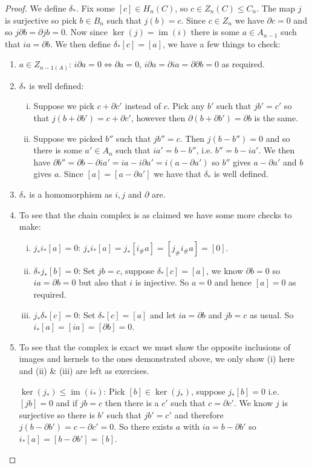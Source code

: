 \documentclass[12pt]{article}
\theoremstyle{definition}
\theoremstyle{definition}
\DeclareMathOperator{\im}{im}
\begin{document}
\begin{proof}
We define $\delta_*$.
Fix some $[c] \in H_n(C)$, so $c\in Z_n(C) \le C_n$.
The map $j$ is surjective so pick $b \in B_n$ such that $j(b) = c$.
Since $c\in Z_n$ we have $\partial c = 0$ and so $j\partial b = \partial j b  = 0$.
Now since $\ker(j) = \im(i)$ there is some $a \in A_{n-1}$ such that $ia = \partial b$.
We then define $\delta_*[c] = [a]$, we have a few things to check:
\begin{enumerate}
\item $a\in Z_{n-1(A)}$: $i\partial a = 0 \iff \partial a = 0$, $i \partial a = \partial ia = \partial \partial b = 0$ as required.
\item $\delta_*$ is well defined:
\begin{enumerate}[(i)]
\item Suppose we pick $c + \partial c'$ instead of $c$.
Pick any $b'$ such that $jb' = c'$ so that $j(b + \partial b') = c + \partial c'$, however then $\partial(b + \partial b') = \partial b$ is the same.
\item Suppose we picked $b''$ such that $jb'' = c$.
Then $j(b- b'') = 0$ and so there is some $a'\in A_n$ such that $ia' = b - b''$, i.e. $b'' = b - ia'$.
We then have $\partial b'' =\partial b  - \partial ia' = ia - i\partial a' = i(a - \partial a')$ so $b''$ gives $a-\partial a'$ and $b$ gives $a$.
Since $[a ] = [a-\partial a']$ we have that $\delta_*$ is well defined.
\end{enumerate}
\item $\delta_*$ is a homomorphism as $i,j$ and $\partial$ are.
\item To see that the chain complex is as claimed we have some more checks to make:
\begin{enumerate}[(i)]
\item $j_*i_*[a] = 0$: $j_*i_*[a]  = j_*[i_\# a] = [j_\# i_\# a ] = [0]$.
\item $\delta_*j_*[b] = 0$: Set $jb = c$, suppose $\delta_*[c] = [a]$, we know $\partial b= 0$ so $ia = \partial b = 0$ but also that $i$ is injective.
So $a = 0$ and hence $[a] = 0$ as required.
\item $j_*\delta_*[c] = 0$: Set $\delta_*[c] = [a]$ and let $ia = \partial b$ and $jb = c$ as usual.
So $i_*[a] = [ia] = [\partial b] = 0$.
\end{enumerate}
\item To see that the complex is exact we must show the opposite inclusions of images and kernels to the ones demonstrated above, we only show (i) here and (ii) \& (iii) are left as exercises.

$\ker(j_*) \le \im (i_*)$: Pick $[b] \in \ker (j_*)$, suppose $j_*[b] = 0$ i.e. $[jb] = 0$ and if $jb = c$ then there is a $c'$ such that $c = \partial c'$.
We know $j$ is surjective so there is $b'$ such that $jb' = c'$ and therefore $j(b - \partial b') = c - \partial c' = 0$.
So there exists $a$ with $ia = b - \partial b'$ so $i_*[a] = [b-\partial b']  = [b]$.
\end{enumerate}
\end{proof}
\end{document}
